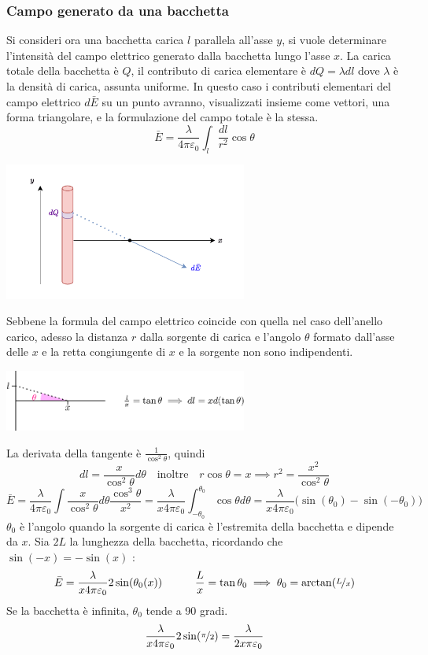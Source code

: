 \documentclass[10pt, letterpaper]{report}
\begin{document}
\subsubsection{Campo generato da una bacchetta}
Si consideri ora una bacchetta carica $l$ parallela all'asse $y$, si vuole determinare l'intensità del campo elettrico generato dalla bacchetta lungo l'asse $x$. La carica totale della bacchetta è $Q$, il contributo di carica elementare è $dQ=\lambda dl$ dove $\lambda$ è la densità di carica, assunta uniforme.\acc 
In questo caso i contributi elementari del campo elettrico $d\bar E$ su un punto avranno, visualizzati insieme come vettori, una forma triangolare, e la formulazione del campo totale è la stessa. 
$$ \bar E = \frac{\lambda}{4\pi\varepsilon_0}\int_l\frac{dl}{r^2}\cos\theta$$
\begin{center}
    \includegraphics[width=0.6\textwidth]{images/bacchettaCarica.pdf}
\end{center}
Sebbene la formula del campo elettrico coincide con quella nel caso dell'anello carico, adesso la distanza $r$ dalla sorgente di carica e l'angolo $\theta$ formato dall'asse delle $x$ e la retta congiungente di  $x$ e la sorgente non sono indipendenti.
\begin{center}
    \includegraphics[width=0.6\textwidth]{images/tan.eps}
\end{center}
La derivata della tangente è $\frac{1}{\cos^2\theta}$, quindi $$ dl=\frac{x}{\cos^2\theta}d\theta
\ \ \ \text{ inoltre } \ \ \
 r\cos\theta=x\implies r^2=\frac{x^2}{\cos^2\theta}$$
$$ \bar E = \frac{\lambda}{4\pi\varepsilon_0}\int \frac{x}{\cos^2\theta}d\theta\frac{\cos^3\theta}{x^2}=\frac{\lambda}{x4\pi\varepsilon_0}\int_{-\theta_0}^{\theta_0}\cos\theta d\theta=\frac{\lambda}{x4\pi\varepsilon_0}\big(\sin(\theta_0)-\sin(-\theta_0)\big)$$
$\theta_0$ è l'angolo quando la sorgente di carica è l'estremita della bacchetta e dipende da $x$. Sia $2L$ la lunghezza della bacchetta, ricordando che $\sin(-x)=-\sin(x)$ :
$$ \bar E =\frac{\lambda}{x4\pi\varepsilon_0}2\sin(\theta_0(x))  \ \ \ \ \ \ \ \  \  \frac{L}{x}=\tan\theta_0\implies \theta_0=\arctan(\nicefrac{L}{x})$$
Se la bacchetta è infinita, $\theta_0$ tende a 90 gradi. 
$$ \frac{\lambda}{x4\pi\varepsilon_0}2\sin(\nicefrac{\pi}{2})=\frac{\lambda}{2x\pi\varepsilon_0}$$
\end{document}
